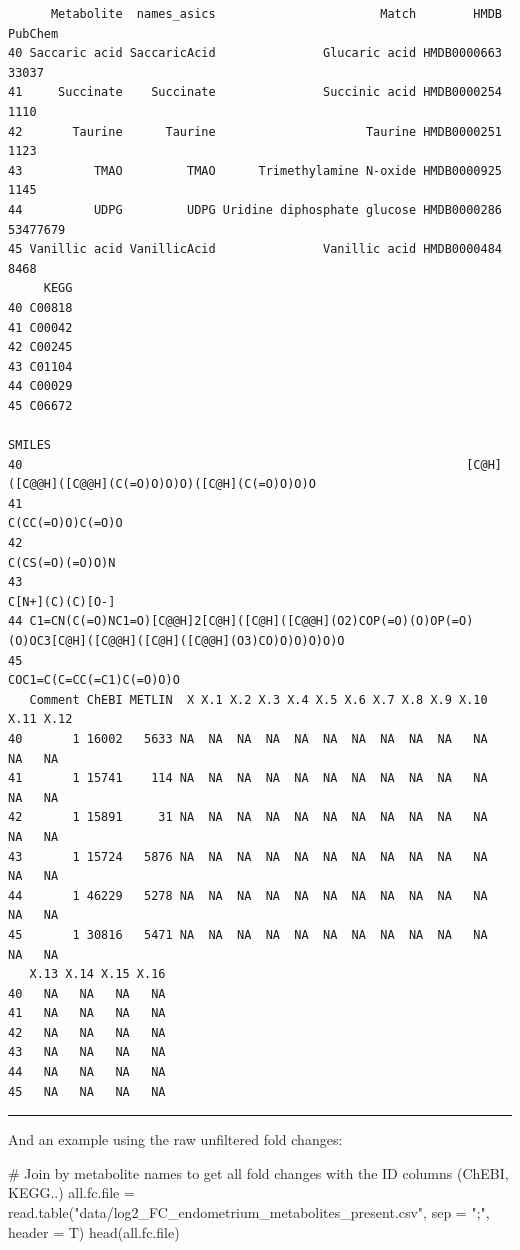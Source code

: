 \documentclass[
  24px,
  letterpaper,
  DIV=11,
  numbers=noendperiod]{scrartcl}
\newenvironment{Shaded}{\begin{snugshade}}{\end{snugshade}}
\newcommand{\AttributeTok}[1]{\textcolor[rgb]{0.40,0.45,0.13}{#1}}
\newcommand{\CommentTok}[1]{\textcolor[rgb]{0.37,0.37,0.37}{#1}}
\newcommand{\FunctionTok}[1]{\textcolor[rgb]{0.28,0.35,0.67}{#1}}
\newcommand{\NormalTok}[1]{\textcolor[rgb]{0.00,0.23,0.31}{#1}}
\newcommand{\OtherTok}[1]{\textcolor[rgb]{0.00,0.23,0.31}{#1}}
\newcommand{\StringTok}[1]{\textcolor[rgb]{0.13,0.47,0.30}{#1}}
\begin{document}
\begin{verbatim}
      Metabolite  names_asics                       Match        HMDB  PubChem
40 Saccaric acid SaccaricAcid               Glucaric acid HMDB0000663    33037
41     Succinate    Succinate               Succinic acid HMDB0000254     1110
42       Taurine      Taurine                     Taurine HMDB0000251     1123
43          TMAO         TMAO      Trimethylamine N-oxide HMDB0000925     1145
44          UDPG         UDPG Uridine diphosphate glucose HMDB0000286 53477679
45 Vanillic acid VanillicAcid               Vanillic acid HMDB0000484     8468
     KEGG
40 C00818
41 C00042
42 C00245
43 C01104
44 C00029
45 C06672
                                                                                                          SMILES
40                                                              [C@H]([C@@H]([C@@H](C(=O)O)O)O)([C@H](C(=O)O)O)O
41                                                                                              C(CC(=O)O)C(=O)O
42                                                                                               C(CS(=O)(=O)O)N
43                                                                                               C[N+](C)(C)[O-]
44 C1=CN(C(=O)NC1=O)[C@@H]2[C@H]([C@H]([C@@H](O2)COP(=O)(O)OP(=O)(O)OC3[C@H]([C@@H]([C@H]([C@@H](O3)CO)O)O)O)O)O
45                                                                                      COC1=C(C=CC(=C1)C(=O)O)O
   Comment ChEBI METLIN  X X.1 X.2 X.3 X.4 X.5 X.6 X.7 X.8 X.9 X.10 X.11 X.12
40       1 16002   5633 NA  NA  NA  NA  NA  NA  NA  NA  NA  NA   NA   NA   NA
41       1 15741    114 NA  NA  NA  NA  NA  NA  NA  NA  NA  NA   NA   NA   NA
42       1 15891     31 NA  NA  NA  NA  NA  NA  NA  NA  NA  NA   NA   NA   NA
43       1 15724   5876 NA  NA  NA  NA  NA  NA  NA  NA  NA  NA   NA   NA   NA
44       1 46229   5278 NA  NA  NA  NA  NA  NA  NA  NA  NA  NA   NA   NA   NA
45       1 30816   5471 NA  NA  NA  NA  NA  NA  NA  NA  NA  NA   NA   NA   NA
   X.13 X.14 X.15 X.16
40   NA   NA   NA   NA
41   NA   NA   NA   NA
42   NA   NA   NA   NA
43   NA   NA   NA   NA
44   NA   NA   NA   NA
45   NA   NA   NA   NA
\end{verbatim}

\begin{center}\rule{0.5\linewidth}{0.5pt}\end{center}

And an example using the raw unfiltered fold changes:

\begin{Shaded}
\begin{Highlighting}[]
\CommentTok{\# Join by metabolite names to get all fold changes with the ID columns (ChEBI, KEGG..)}
\NormalTok{all.fc.file }\OtherTok{=} \FunctionTok{read.table}\NormalTok{(}\StringTok{"data/log2\_FC\_endometrium\_metabolites\_present.csv"}\NormalTok{, }\AttributeTok{sep =} \StringTok{";"}\NormalTok{, }\AttributeTok{header =}\NormalTok{ T) }
\FunctionTok{head}\NormalTok{(all.fc.file)}
\end{Highlighting}
\end{Shaded}
\end{document}
